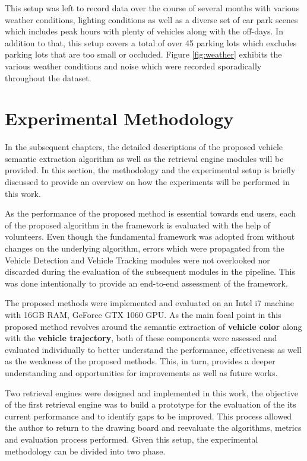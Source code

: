 This setup was left to record data over the course of several months with various weather conditions, lighting conditions as well as a diverse set of car park scenes which includes peak hours with plenty of vehicles along with the off-days. In addition to that, this setup covers a total of over 45 parking lots which excludes parking lots that are too small or occluded. Figure \ref{fig:weather} exhibits the various weather conditions and noise which were recorded sporadically throughout the dataset.





\section{Experimental Methodology}
\label{sec:expmethodology}

In the subsequent chapters, the detailed descriptions of the proposed vehicle semantic extraction algorithm as well as the retrieval engine modules will be provided. In this section, the methodology and the experimental setup is briefly discussed to provide an overview on how the experiments will be performed in this work.

As the performance of the proposed method is essential towards end users, each of the proposed algorithm in the framework is evaluated with the help of volunteers. Even though the fundamental framework was adopted from \cite{lim2017} without changes on the underlying algorithm, errors which were propagated from the Vehicle Detection and Vehicle Tracking modules were not overlooked nor discarded during the evaluation of the subsequent modules in the pipeline. This was done intentionally to provide an end-to-end assessment of the framework. 

The proposed methods were implemented and evaluated on an Intel i7 machine with 16GB RAM, GeForce GTX 1060 GPU. As the main focal point in this proposed method revolves around the semantic extraction of \textbf{vehicle color} along with the \textbf{vehicle trajectory}, both of these components were assessed and evaluated individually to better understand the performance, effectiveness as well as the weakness of the proposed methods. This, in turn, provides a deeper understanding and opportunities for improvements as well as future works. 

Two retrieval engines were designed and implemented in this work, the objective of the first retrieval engine was to build a prototype for the evaluation of the its current performance and to identify gaps to be improved. This process allowed the author to return to the drawing board and reevaluate the algorithms, metrics and evaluation process performed. Given this setup, the experimental methodology can be divided into two phase. 


